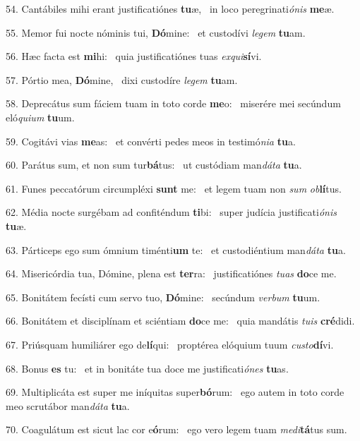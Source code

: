 54. Cantábiles mihi erant justificatiónes \textbf{tu}æ, \ast\  in loco peregrinati\textit{ó}\textit{nis} \textbf{me}æ.\

55. Memor fui nocte nóminis tui, \textbf{Dó}mine: \ast\  et custodívi \textit{le}\textit{gem} \textbf{tu}am.\

56. Hæc facta est \textbf{mi}hi: \ast\  quia justificatiónes tuas \textit{ex}\textit{qui}\textbf{sí}vi.\

57. Pórtio mea, \textbf{Dó}mine, \ast\  dixi custodíre \textit{le}\textit{gem} \textbf{tu}am.\

58. Deprecátus sum fáciem tuam in toto corde \textbf{me}o: \ast\  miserére mei secúndum eló\textit{qui}\textit{um} \textbf{tu}um.\

59. Cogitávi vias \textbf{me}as: \ast\  et convérti pedes meos in testimó\textit{ni}\textit{a} \textbf{tu}a.\

60. Parátus sum, et non sum tur\textbf{bá}tus: \ast\  ut custódiam man\textit{dá}\textit{ta} \textbf{tu}a.\

61. Funes peccatórum circumpléxi \textbf{sunt} me: \ast\  et legem tuam non \textit{sum} \textit{ob}\textbf{lí}tus.\

62. Média nocte surgébam ad confiténdum \textbf{ti}bi: \ast\  super judícia justificati\textit{ó}\textit{nis} \textbf{tu}æ.\

63. Párticeps ego sum ómnium timénti\textbf{um} te: \ast\  et custodiéntium man\textit{dá}\textit{ta} \textbf{tu}a.\

64. Misericórdia tua, Dómine, plena est \textbf{ter}ra: \ast\  justificatiónes \textit{tu}\textit{as} \textbf{do}ce me.\

65. Bonitátem fecísti cum servo tuo, \textbf{Dó}mine: \ast\  secúndum \textit{ver}\textit{bum} \textbf{tu}um.\

66. Bonitátem et disciplínam et sciéntiam \textbf{do}ce me: \ast\  quia mandátis \textit{tu}\textit{is} \textbf{cré}didi.\

67. Priúsquam humiliárer ego de\textbf{lí}qui: \ast\  proptérea elóquium tuum \textit{cus}\textit{to}\textbf{dí}vi.\

68. Bonus \textbf{es} tu: \ast\  et in bonitáte tua doce me justificati\textit{ó}\textit{nes} \textbf{tu}as.\

69. Multiplicáta est super me iníquitas super\textbf{bó}rum: \ast\  ego autem in toto corde meo scrutábor man\textit{dá}\textit{ta} \textbf{tu}a.\

70. Coagulátum est sicut lac cor e\textbf{ó}rum: \ast\  ego vero legem tuam \textit{me}\textit{di}\textbf{tá}tus sum.\

